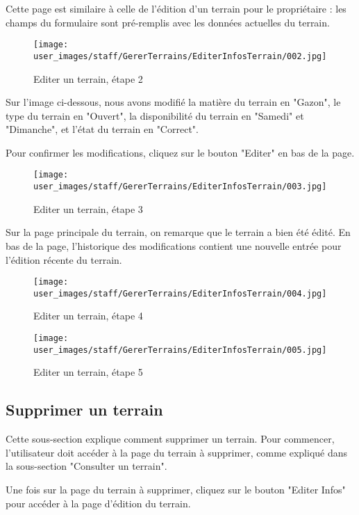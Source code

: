 Cette page est similaire à celle de l'édition d'un terrain pour le propriétaire : les champs du formulaire sont pré-remplis avec les données actuelles du terrain.\newline

\begin{figure}[H]
\centering
\texttt{[image: user\_images/staff/GererTerrains/EditerInfosTerrain/002.jpg]}
\caption{Editer un terrain, étape 2}
\end{figure}

Sur l'image ci-dessous, nous avons modifié la matière du terrain en "Gazon", le type du terrain en "Ouvert", la disponibilité du terrain en "Samedi" et "Dimanche", et l'état du terrain en "Correct".\newline

Pour confirmer les modifications, cliquez sur le bouton "Editer" en bas de la page. 

\begin{figure}[H]
\centering
\texttt{[image: user\_images/staff/GererTerrains/EditerInfosTerrain/003.jpg]}
\caption{Editer un terrain, étape 3}
\end{figure}

Sur la page principale du terrain, on remarque que le terrain a bien été édité. En bas de la page, l'historique des modifications contient une nouvelle entrée pour l'édition récente du terrain.

\begin{figure}[H]
\centering
\texttt{[image: user\_images/staff/GererTerrains/EditerInfosTerrain/004.jpg]}
\caption{Editer un terrain, étape 4}
\end{figure}

\begin{figure}[H]
\centering
\texttt{[image: user\_images/staff/GererTerrains/EditerInfosTerrain/005.jpg]}
\caption{Editer un terrain, étape 5}
\end{figure}

\subsection{Supprimer un terrain}

Cette sous-section explique comment supprimer un terrain. Pour commencer, l'utilisateur doit accéder à la page du terrain à supprimer, comme expliqué dans la sous-section "Consulter un terrain".\newline

Une fois sur la page du terrain à supprimer, cliquez sur le bouton "Editer Infos" pour accéder à la page d'édition du terrain.

